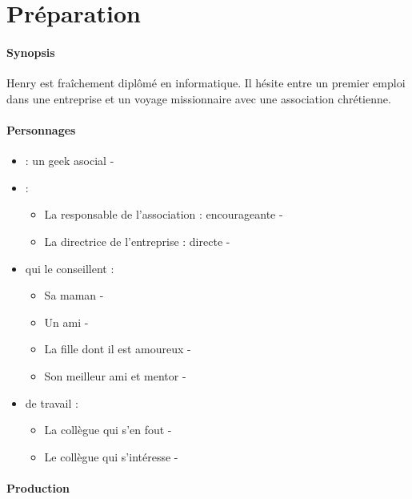 \section{Préparation}

	\paragraph{Synopsis}

	Henry est fraîchement diplômé en informatique.
	Il hésite entre un premier emploi dans une entreprise
	et un voyage missionnaire avec une association
	chrétienne.

	\paragraph{Personnages}
	
	\begin{itemize}
	\item {} : un geek asocial - 
	\item {} : 
		\begin{itemize}
		\item La responsable de l'association : encourageante  -  
		\item La directrice de l'entreprise : directe - 
		\end{itemize}
	\item {} qui le conseillent :
		\begin{itemize}
		\item Sa maman - 
		\item Un ami - 
		\item La fille dont il est amoureux - 
		\item Son meilleur ami et mentor - 
		\end{itemize}
	\item {} de travail :
		\begin{itemize}
		\item La collègue qui s'en fout - 
		\item Le collègue qui s'intéresse - 
		\end{itemize}
	\end{itemize}
	
	\paragraph{Production}
	
